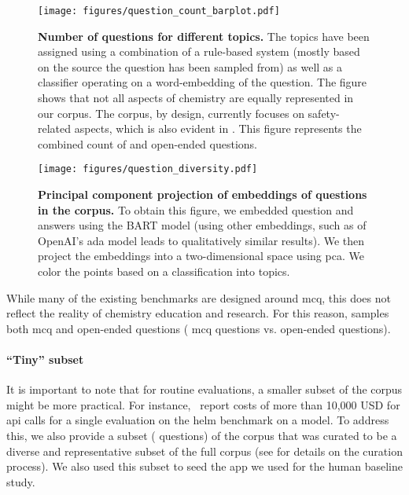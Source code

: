 \documentclass[11pt, oneside]{article}
\begin{document}
\begin{figure}
    \centering
    \texttt{[image: figures/question\_count\_barplot.pdf]}
    \caption{\textbf{Number of questions for different topics.} The topics have been assigned using a combination of a rule-based system (mostly based on the source the question has been sampled from) as well as a classifier operating on a word-embedding of the question. 
    The figure shows that not all aspects of chemistry are equally represented in our corpus. The \chembench corpus, by design, currently focuses on safety-related aspects, which is also evident in . This figure represents the combined count of  and open-ended questions.}
    \label{fig:topic_barplot}
\end{figure}

\begin{figure}
    \centering
    \texttt{[image: figures/question\_diversity.pdf]}
    \caption{\textbf{Principal component projection of embeddings of questions in the \chembench corpus.} To obtain this figure, we embedded question and answers using the BART model (using other embeddings, such as of OpenAI's ada model leads to qualitatively similar results). We then project the embeddings into a two-dimensional space using \gls{pca}. We color the points based on a classification into topics.}
    \label{fig:question_diversity}
\end{figure}

While many of the existing benchmarks are designed around \gls{mcq}, this does not reflect the reality of chemistry education and research.
For this reason, \chembench samples both \gls{mcq} and open-ended questions ( \gls{mcq} questions vs.  open-ended questions).


\paragraph{\enquote{Tiny} subset}
It is important to note that for routine evaluations, a smaller subset of the corpus might be more practical.\cite{polo2024tinybenchmarks}
For instance,~\citet{liang2023holistic} report costs of more than 10,000 USD for \gls{api} calls for a single evaluation on the \gls{helm} benchmark on a model. 
To address this, we also provide a subset ( questions) of the corpus that was curated to be a diverse and representative subset of the full corpus (see  for details on the curation process).
We also used this subset to seed the app we used for the human baseline study. 
\end{document}
